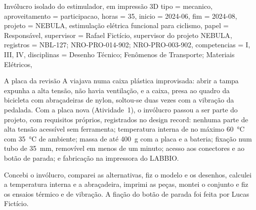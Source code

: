 \begin{atividade}{Invólucro isolado do estimulador, em impressão 3D}{
  tipo         = mecanico,
  aproveitamento = participacao,
  horas        = 35,
  inicio       = 2024-06,
  fim          = 2024-08,
  projeto      = {NEBULA, estimulação elétrica funcional para ciclismo},
  papel        = Responsável,
  supervisor   = {Rafael Fictício, supervisor do projeto NEBULA},
  registros    = {NBL-127; NRO-PRO-014-902; NRO-PRO-003-902},
  competencias = {I, III, IV},
  disciplinas  = {Desenho Técnico; Fenômenos de Transporte; Materiais Elétricos},
}

\begin{contexto}
A placa da revisão A viajava numa caixa plástica improvisada: abrir a tampa expunha a alta tensão,
não havia ventilação, e a caixa, presa ao quadro da bicicleta com abraçadeiras de nylon, soltou-se duas
vezes com a vibração da pedalada. Com a placa nova (Atividade~1), o invólucro passou a ser parte do
projeto, com requisitos próprios, registrados no design record: nenhuma parte de alta tensão acessível
sem ferramenta; temperatura interna de no máximo \SI{60}{\celsius} com \SI{35}{\celsius} de ambiente;
massa de até \SI{400}{\gram} com a placa e a bateria; fixação num tubo de \SI{35}{\milli\meter},
removível em menos de um minuto; acesso aos conectores e ao botão de parada; e fabricação na impressora
do LABBIO.
\end{contexto}

\begin{contribuicao}
Concebi o invólucro, comparei as alternativas, fiz o modelo e os desenhos, calculei a temperatura
interna e a abraçadeira, imprimi as peças, montei o conjunto e fiz os ensaios térmico e de vibração. A
fiação do botão de parada foi feita por Lucas Fictício.
\end{contribuicao}

\begin{desenvolvimento}


\end{desenvolvimento}
\end{atividade}
